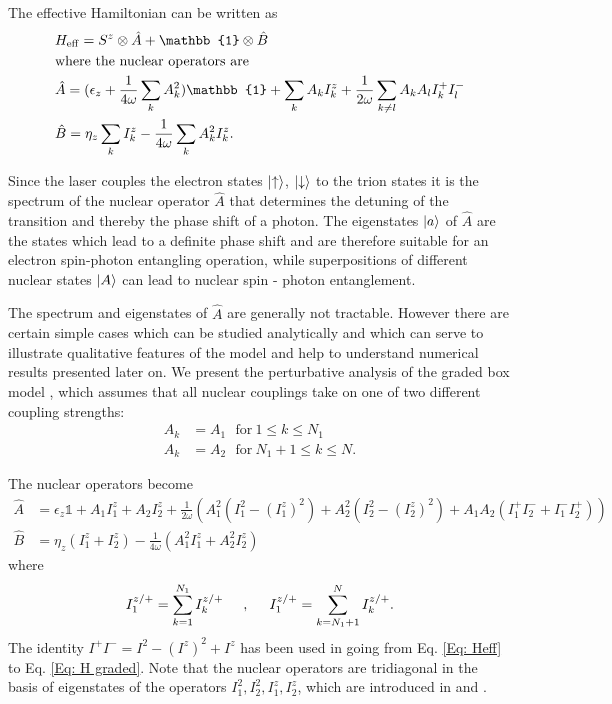 \documentclass[aps, pra, amsfonts, a4paper, showpacs]{revtex4-1}
\begin{document}
The effective Hamiltonian can be written as 
\begin{equation}\begin{split}
&\heff =S^z \otimes \hat{A} + \mathbb{1} \otimes \hat{B} \\
&\mathrm{where\ the\ nuclear\ operators\ are}\\
&\hat{A}=(\epsilon_z + \frac{1}{4\omega}\sum_k A_k^2)\mathbb{1} + \sum_k A_k I_k^z + \frac{1}{2\omega}\sum_{k \neq l} A_k A_l I_k^+ I_l^- \\
&\hat{B} = \eta_z \sum_k I_k^z - \frac{1}{4\omega} \sum_k A_k^2 I_k^z.
\end{split} \label{Eq. AB} \end{equation}

Since the laser couples the electron states $\ket{\uparrow}$, $\ket{\downarrow}$ to the trion states it is the spectrum of the nuclear operator $\hat{A}$ that determines the detuning of the transition and thereby the phase shift of a photon. The eigenstates $\ket{a}$ of $\hat{A}$ are the states which lead to a definite phase shift and are therefore suitable for an electron spin-photon entangling operation, while superpositions of different nuclear states $\ket{A}$ can lead to nuclear spin - photon entanglement.

The spectrum and eigenstates of $\hat{A}$ are generally not tractable. However there are certain simple cases which can be studied analytically and which can serve to illustrate qualitative features of the model and help to understand numerical results presented later on. We present the perturbative analysis of the graded box model \cite{petrov_coupled_2009}, which assumes that all nuclear couplings take on one of two different coupling strengths:
\begin{equation}\begin{split}
A_k &= A_1\ \ \ \mathrm{for}\ 1 \leq k \leq N_1\\ 
A_k &= A_2\ \ \ \mathrm{for}\ N_1+1 \leq k \leq N.
\end{split} \label{Eq: A graded} \end{equation}

The nuclear operators become
\begin{equation}\begin{split}
\hat{A}&=\epsilon_z \mathbb{1} + A_1 I_1^z + A_2 I_2^z + \frac{1}{2\omega}\left(A_1^2 (I_1^2 - (I_1^z)^2) + A_2^2 (I_2^2 - (I_2^z)^2 ) + A_1 A_2 (I_1^+ I_2^- + I_1^- I_2^+)\right) \\
\hat{B}&=\eta_z(I_1^z + I_2^z) -  \frac{1}{4\omega}(A_1^2 I_1^z + A_2^2 I_2^z)
\end{split} \label{Eq: H graded}
\end{equation}
where
\[
I^{z/+}_1 = \sum_{k=1}^{N_1} I_k^{z/+} \hspace{0.5cm} ,\hspace{0.5cm} I^{z/+}_1 = \sum_{k=N_1+1}^{N} I_k^{z/+}.
\]
The identity $I^+I^-=I^2 - (I^z)^2 + I^z$ has been used in going from Eq. \ref{Eq: Heff} to Eq. \ref{Eq: H graded}. Note that the nuclear operators are tridiagonal in the basis of eigenstates of the operators $I_1^2, I_2^2, I_1^z, I_2^z$, which are introduced in \cite{petrov_coupled_2009} and \cite{kozlov_exactly_2007}. 
\end{document}
